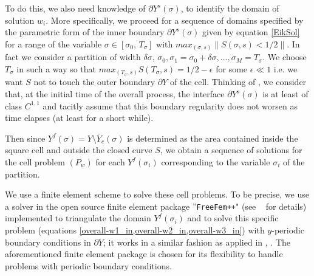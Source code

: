 \documentclass[reqno, 11pt]{amsart}
\numberwithin{equation}{section}
\newcommand{\AM}[1]{{\color{brown}#1}}
\newcommand{\clr}{\color{red}}
\begin{document}
To do this, we also need knowledge of $\partial Y^s(\sigma)$, 
to identify the domain of solution $w_i$.
  More specifically, we proceed for a sequence of domains specified by the  parametric form of the inner boundary 
  $\partial Y^s(\sigma)$ given by equation \eqref{EikSol} for a range of the variable 
   $\sigma\in [\sigma_0,\,T_{\sigma}]$  with $max_{(\sigma, s)}\|S(\sigma,s)< 1/2\|$. In fact we consider 
  a partition of width $\delta \sigma$, $\sigma_0, \sigma_1=\sigma_0+\delta \sigma,\ldots, \sigma_{M}=T_{\sigma}$.
 We choose $T_{\sigma}$ in such a way so that $max_{(T_\sigma, s)} S(T_\sigma,s)=1/2-\epsilon$ for some $\epsilon\ll 1$ i.e. we want $S$ not to touch the outer boundary $\partial Y$ of the cell. 
 Thinking of \cite{Thomas}, we consider that, at the initial time of the overall process,  the interface $\partial Y^s(\sigma)$ is at least of class $C^{1,1}$ and tacitly assume that this boundary regularity does not worsen as time elapses (at least for a short while).
  
   Then since $Y^f(\sigma)= Y\setminus \bar{Y}_c(\sigma)$ is determined as the area contained inside the square cell and outside  the closed curve $S$,  we obtain a sequence of solutions for the cell problem $(P_w)$ for each 
$  Y^f(\sigma_i)$ corresponding to the variable $\sigma_i$ of the partition. 

 We  use a finite element scheme to solve these cell problems. 
    To be precise, we use  a solver in the open source finite element package ''\texttt{FreeFem++}" (see ~\cite{FreeFEM} for details) 
 implemented  to   triangulate the domain $Y^f(\sigma_i)$ and  to solve this specific problem (equations \cref{overall-w1_in,overall-w2_in,overall-w3_in}) with $y$-periodic boundary conditions in $\partial Y$; it works in a similar fashion as applied in \cite{EdenNikolopoulosMuntean22}  \cite{MC20}, \cite{CN18}.  The aforementioned finite element package is chosen  for its flexibility to handle  problems with periodic boundary conditions.
  

\end{document}
